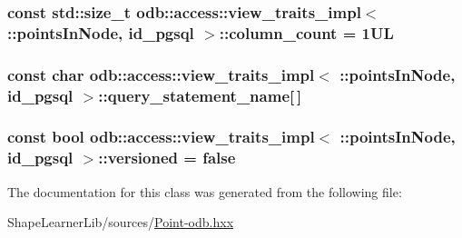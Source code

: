 \subsubsection[{column\+\_\+count}]{\setlength{\rightskip}{0pt plus 5cm}const std\+::size\+\_\+t odb\+::access\+::view\+\_\+traits\+\_\+impl$<$ \+::{\bf points\+In\+Node}, id\+\_\+pgsql $>$\+::column\+\_\+count = 1\+U\+L\hspace{0.3cm}{\ttfamily [static]}}\label{classodb_1_1access_1_1view__traits__impl_3_01_1_1points_in_node_00_01id__pgsql_01_4_af41e61cfd9c13d625a546762035ea806}
\hypertarget{classodb_1_1access_1_1view__traits__impl_3_01_1_1points_in_node_00_01id__pgsql_01_4_aa5db520afb8385f968d9c1c806dd5d4c}{}
\subsubsection[{query\+\_\+statement\+\_\+name}]{\setlength{\rightskip}{0pt plus 5cm}const char odb\+::access\+::view\+\_\+traits\+\_\+impl$<$ \+::{\bf points\+In\+Node}, id\+\_\+pgsql $>$\+::query\+\_\+statement\+\_\+name\mbox{[}$\,$\mbox{]}\hspace{0.3cm}{\ttfamily [static]}}\label{classodb_1_1access_1_1view__traits__impl_3_01_1_1points_in_node_00_01id__pgsql_01_4_aa5db520afb8385f968d9c1c806dd5d4c}
\hypertarget{classodb_1_1access_1_1view__traits__impl_3_01_1_1points_in_node_00_01id__pgsql_01_4_acc62ebf7f8b1bd4486f7bff43c84b655}{}
\subsubsection[{versioned}]{\setlength{\rightskip}{0pt plus 5cm}const bool odb\+::access\+::view\+\_\+traits\+\_\+impl$<$ \+::{\bf points\+In\+Node}, id\+\_\+pgsql $>$\+::versioned = false\hspace{0.3cm}{\ttfamily [static]}}\label{classodb_1_1access_1_1view__traits__impl_3_01_1_1points_in_node_00_01id__pgsql_01_4_acc62ebf7f8b1bd4486f7bff43c84b655}


The documentation for this class was generated from the following file\+:\begin{DoxyCompactItemize}
\item 
Shape\+Learner\+Lib/sources/\hyperlink{_point-odb_8hxx}{Point-\/odb.\+hxx}\end{DoxyCompactItemize}
